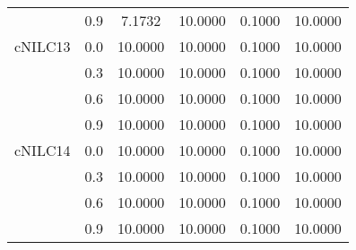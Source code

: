 \begin{longtable}{cccccc}
        & 0.9 & 7.1732 & 10.0000 & 0.1000 & 10.0000 \\
cNILC13 & 0.0 & 10.0000 & 10.0000 & 0.1000 & 10.0000 \\
        & 0.3 & 10.0000 & 10.0000 & 0.1000 & 10.0000 \\
        & 0.6 & 10.0000 & 10.0000 & 0.1000 & 10.0000 \\
        & 0.9 & 10.0000 & 10.0000 & 0.1000 & 10.0000 \\
cNILC14 & 0.0 & 10.0000 & 10.0000 & 0.1000 & 10.0000 \\
        & 0.3 & 10.0000 & 10.0000 & 0.1000 & 10.0000 \\
        & 0.6 & 10.0000 & 10.0000 & 0.1000 & 10.0000 \\
        & 0.9 & 10.0000 & 10.0000 & 0.1000 & 10.0000 \\
\end{longtable}
